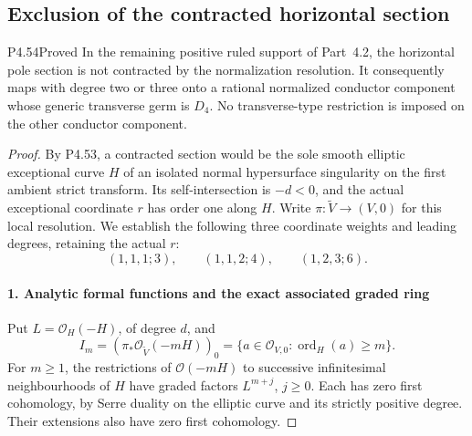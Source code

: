 \subsection{Exclusion of the contracted horizontal section}

\begin{statement}{P4.54}{Proved}
In the remaining positive ruled support of Part~4.2,
the horizontal pole section is not contracted by the
normalization resolution. It consequently maps with
degree two or three onto a rational normalized conductor
component whose generic transverse germ is $D_4$.
No transverse-type restriction is imposed on the other
conductor component.
\end{statement}
\begin{proof}
By P4.53, a contracted section would be the sole smooth
elliptic exceptional curve $H$ of an isolated normal
hypersurface singularity on the first ambient strict
transform. Its self-intersection is $-d<0$, and the
actual exceptional coordinate $r$ has order one along
$H$. Write $\pi:\widetilde V\to(V,0)$ for this local
resolution. We establish the following three coordinate
weights and leading degrees, retaining the actual $r$:
\[
 (1,1,1;3),\qquad(1,1,2;4),\qquad(1,2,3;6).
                                                        \tag{4.54w.1}
\]

\paragraph{1. Analytic formal functions and the exact associated graded ring}

Put \(L=\mathcal O_H(-H)\), of degree \(d\), and
\[
 I_m=(\pi_*\mathcal O_{\widetilde V}(-mH))_0
     =\{a\in\mathcal O_{V,0}:\operatorname{ord}_H(a)\ge m\}.
\]
For \(m\ge1\), the restrictions of
\(\mathcal O(-mH)\) to successive infinitesimal neighbourhoods
of \(H\) have graded factors \(L^{m+j}\), \(j\ge0\).
Each has zero first cohomology, by Serre duality on the elliptic
curve and its strictly positive degree. Their extensions also
have zero first cohomology.


\end{proof}
